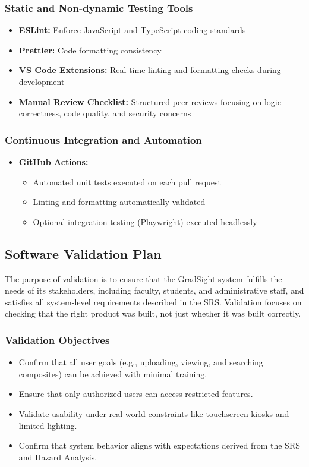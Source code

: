 \documentclass[12pt, titlepage]{article}
\begin{document}
\subsubsection*{Static and Non-dynamic Testing Tools}
\begin{itemize}
  \item \textbf{ESLint:} Enforce JavaScript and TypeScript coding standards
  \item \textbf{Prettier:} Code formatting consistency
  \item \textbf{VS Code Extensions:} Real-time linting and formatting checks during development
  \item \textbf{Manual Review Checklist:} Structured peer reviews focusing on logic correctness, code quality, and security concerns
\end{itemize}

\subsubsection*{Continuous Integration and Automation}
\begin{itemize}
  \item \textbf{GitHub Actions:}
  \begin{itemize}
    \item Automated unit tests executed on each pull request
    \item Linting and formatting automatically validated
    \item Optional integration testing (Playwright) executed headlessly
  \end{itemize}
\end{itemize}

\subsection{Software Validation Plan}

The purpose of validation is to ensure that the GradSight system fulfills the needs of its stakeholders, including faculty, students, and administrative staff, and satisfies all system-level requirements described in the SRS. Validation focuses on checking that the right product was built, not just whether it was built correctly.

\subsubsection*{Validation Objectives}
\begin{itemize}
    \item Confirm that all user goals (e.g., uploading, viewing, and searching composites) can be achieved with minimal training.
    \item Ensure that only authorized users can access restricted features.
    \item Validate usability under real-world constraints like touchscreen kiosks and limited lighting.
    \item Confirm that system behavior aligns with expectations derived from the SRS and Hazard Analysis.
\end{itemize}
\end{document}

